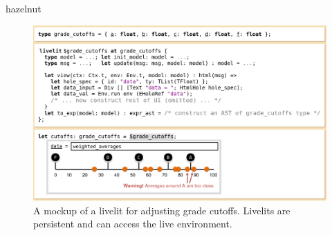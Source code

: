 hazelnut~\citep{Hazelnut,HazelnutLive}



\begin{figure}[t!]
  \begin{center}
  \includegraphics[width=34pc]{cutoffs-mockup.png}\end{center}
  \caption{A mockup of a livelit for adjusting grade cutoffs. Livelits are persistent and can access the live environment.}
  \label{fig:cutoffs}
  \end{figure}
  